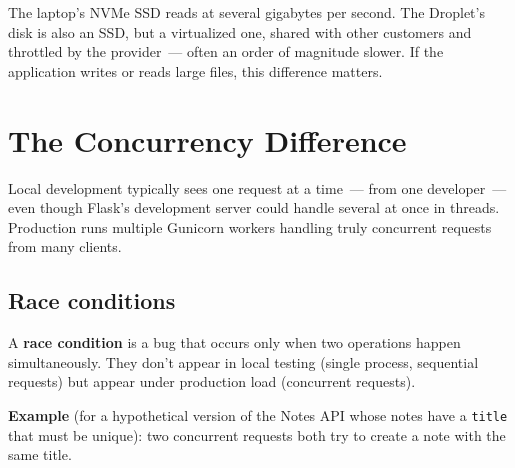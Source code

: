 The laptop's NVMe SSD reads at several gigabytes per second. The Droplet's disk is also an SSD, but a virtualized one, shared with other customers and throttled by the provider~--- often an order of magnitude slower. If the application writes or reads large files, this difference matters.

\setcounter{section}{5}
\section{The Concurrency Difference}\label{39-local-vs-production:396-the-concurrency-difference}

Local development typically sees one request at a time~--- from one developer~--- even though Flask's development server could handle several at once in threads. Production runs multiple Gunicorn workers handling truly concurrent requests from many clients.

\subsection*{Race conditions}\label{39-local-vs-production:race-conditions}

A \textbf{race condition} is a bug that occurs only when two operations happen simultaneously. They don't appear in local testing (single process, sequential requests) but appear under production load (concurrent requests).

\textbf{Example} (for a hypothetical version of the Notes API whose notes have a \texttt{title} that must be unique): two concurrent requests both try to create a note with the same title.

\begin{codebox}[short]

\begin{Shaded}
\begin{Highlighting}[]
  \NormalTok{:}
    \NormalTok{: }\NormalTok{\}), }

\end{Highlighting}
\end{Shaded}

\end{codebox}

